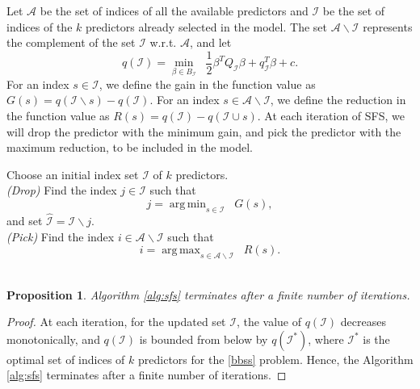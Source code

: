 \documentclass[10pt, letterpaper]{article}
\newtheorem{proposition}{Proposition}[section]
\DeclareMathOperator*{\argmax}{arg\,max}
\DeclareMathOperator*{\argmin}{arg\,min}
\begin{document}
 Let $\mathcal{A}$ be the set of indices of all the available predictors and $\mathcal{I}$ be the set of indices of the $k$ predictors already selected in the model. The set $\mathcal{A} \backslash \mathcal{I}$ represents the complement of the set $\mathcal{I}$ w.r.t. $\mathcal{A}$, and let
\[ q(\mathcal{I}) = \min_{\beta \in B_{\mathcal{I}}} \; \; \frac{1}{2}\beta^{T}Q_{\mathcal{I}}\beta + q_{\mathcal{I}}^{T}\beta+c. \]
 For an index $ s \in \mathcal{I}$, we define the gain in the function value as
\( G(s)=q(\mathcal{I}\backslash s) -q(\mathcal{I}). \)
For an index $ s \in \mathcal{A}\backslash \mathcal{I}$, we define the reduction in the function value as
\( R(s)=q(\mathcal{I})-q(\mathcal{I}\cup s). \)
At each iteration of SFS, we will drop the predictor with the minimum gain, and pick the predictor with the maximum reduction, to be included in the model.
\begin{algorithm}
\caption{SFS}
\label{alg:sfs}
      Choose an initial index set $\mathcal{I}$ of $k$ predictors.\\ 
     \textit{(Drop)}\label{alg:sfs_drop} Find the index $j \in \mathcal{I}$ such that
       \[  j=\argmin_{s \in \mathcal{I}} \; \; G(s),   
       \] and set $\hat{\mathcal{I}}=\mathcal{I} \backslash j $.      \\
       \textit{(Pick)} Find the index $i \in \mathcal{A}\backslash \mathcal{I}$ such that
       \[  i = \argmax_{s \in \mathcal{A} \backslash \mathcal{I}} \; \; R(s). \]   \\
\end{algorithm}
\begin{proposition}
Algorithm \ref{alg:sfs} terminates after a finite number of iterations.
\end{proposition}
\begin{proof}
At each iteration, for the updated set $\mathcal{I}$, the value of $q(\mathcal{I})$ decreases monotonically, and $q(\mathcal{I})$ is bounded from below by $q(\mathcal{I}^{*})$, where $\mathcal{I}^{*}$ is the optimal set of indices of $k$ predictors for the \eqref{bbss} problem. Hence, the Algorithm \ref{alg:sfs} terminates after a finite number of iterations.
\end{proof} 
\end{document}
